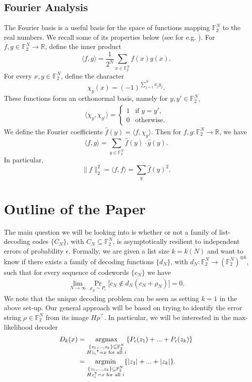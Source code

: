 \documentclass[12pt]{article}
\newcommand{\R}{\mathbb{R}}
\newcommand{\F}{\mathbb{F}}
\begin{document}
\subsection{Fourier Analysis}\label{sectionfourier}
The Fourier basis is a useful basis for the space of functions mapping $\F_2^N$ to the real numbers. We recall some of its properties below (see for e.g. \cite{2008wolffourier}). For $f,g \in \F_2^N\rightarrow \R$, define the inner product $$ \langle f, g \rangle = \frac{1}{2^N}\sum_{x \in \F_2^N} f(x) g(x).$$
For every $x,y \in \F_2^N$, define the character
$$ \chi_y(x) = (-1)^{\sum_{j=1}^N  x_j y_j }.$$ These functions form an orthonormal basis, namely for $y,y' \in \F_2^N$,
\begin{align*}
\langle \chi_y, \chi_{y'} \rangle = \begin{cases}
1 & \text{if $y=y'$,}\\
0 & \text{otherwise.}
\end{cases}
\end{align*}
We define the Fourier coefficients $\hat{f}(y) = \langle f, \chi_y \rangle$. Then for $f,g : \F_2^N \rightarrow \R$, we have 
$$\langle f, g \rangle = \sum_{y \in \F_2^N} \hat{f}(y) \cdot \hat{g}(y).$$
In particular, $$\|f \|^2_2 = \langle f, f \rangle = \sum_y \hat{f}(y)^2.$$ 


\section{Outline of the Paper}
The main question we will be looking into is whether or not a family of list-decoding codes $\{C_N\}$, with $C_N\subseteq\mathbb{F}_2^N$, is asymptotically resilient to independent errors of probability $\epsilon$. Formally, we are given a list size $k=k(N)$ and want to know if there exists a family of decoding functions $\{d_N\}$, with $d_N:\mathbb{F}_2^N\rightarrow \left(\mathbb{F}_2^N\right)^{\otimes k}$, such that for every sequence of codewords $\{c_N\}$ we have
\begin{align*}
    \lim_{N\rightarrow \infty}\Pr_{\rho_N\sim P_\epsilon} \big[c_N \notin d_N(c_N+\rho_N)\big] = 0.
\end{align*}
We note that the unique decoding problem can be seen as setting $k=1$ in the above set-up. 
Our general approach will be based on trying to identify the error string $\rho\in\F_2^N$ from its image $H\rho^\intercal$. In particular, we will be interested in the max-likelihood decoder
\begin{align}\label{maxdecoderlist}
D_k(x)&=\mathop{\textnormal{argmax}}_{\substack{\{z_1,...,z_k\}\subseteq \mathbb{F}_2^N\\{Hz_i}^\intercal=x \textnormal{ for all }i}}\{P_\epsilon(z_1)+...+P_\epsilon(z_k)\} \nonumber \\ 
&=\mathop{\textnormal{argmin}}_{\substack{\{z_1,...,z_k\}\subseteq \mathbb{F}_2^N\\Hz_i^\intercal=x \textnormal{ for all }i}}\{|z_1|+...+|z_k|\}.
\end{align}
\end{document}
